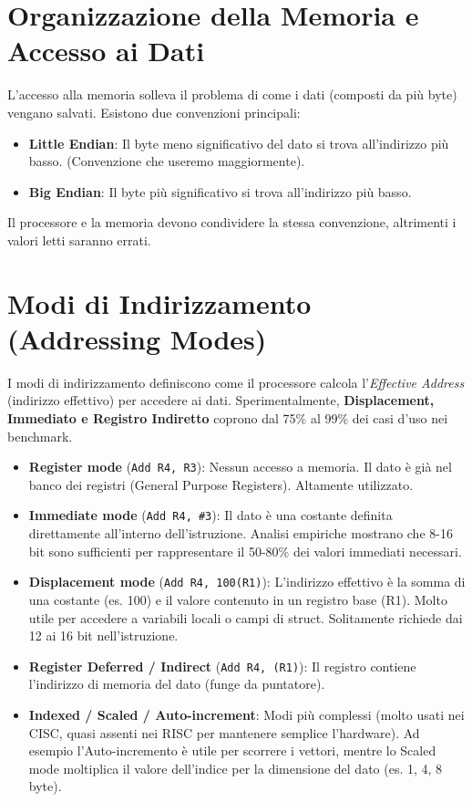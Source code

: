 \section{Organizzazione della Memoria e Accesso ai Dati}
L'accesso alla memoria solleva il problema di come i dati (composti da più byte) vengano salvati.
Esistono due convenzioni principali:
\begin{itemize}
    \item \textbf{Little Endian}: Il byte meno significativo del dato si trova all'indirizzo più basso. (Convenzione che useremo maggiormente).
    \item \textbf{Big Endian}: Il byte più significativo si trova all'indirizzo più basso.
\end{itemize}
Il processore e la memoria devono condividere la stessa convenzione, altrimenti i valori letti saranno errati. 

\section{Modi di Indirizzamento (Addressing Modes)}
I modi di indirizzamento definiscono come il processore calcola l'\textit{Effective Address} (indirizzo effettivo) per accedere ai dati. Sperimentalmente, \textbf{Displacement, Immediato e Registro Indiretto} coprono dal 75\% al 99\% dei casi d'uso nei benchmark.

\begin{itemize}
    \item \textbf{Register mode} (\texttt{Add R4, R3}): Nessun accesso a memoria. Il dato è già nel banco dei registri (General Purpose Registers). Altamente utilizzato.
    \item \textbf{Immediate mode} (\texttt{Add R4, \#3}): Il dato è una costante definita direttamente all'interno dell'istruzione. Analisi empiriche mostrano che 8-16 bit sono sufficienti per rappresentare il 50-80\% dei valori immediati necessari.
    \item \textbf{Displacement mode} (\texttt{Add R4, 100(R1)}): L'indirizzo effettivo è la somma di una costante (es. 100) e il valore contenuto in un registro base (R1). Molto utile per accedere a variabili locali o campi di struct. Solitamente richiede dai 12 ai 16 bit nell'istruzione.
    \item \textbf{Register Deferred / Indirect} (\texttt{Add R4, (R1)}): Il registro contiene l'indirizzo di memoria del dato (funge da puntatore).
    \item \textbf{Indexed / Scaled / Auto-increment}: Modi più complessi (molto usati nei CISC, quasi assenti nei RISC per mantenere semplice l'hardware). Ad esempio l'Auto-incremento è utile per scorrere i vettori, mentre lo Scaled mode moltiplica il valore dell'indice per la dimensione del dato (es. 1, 4, 8 byte).
\end{itemize}

